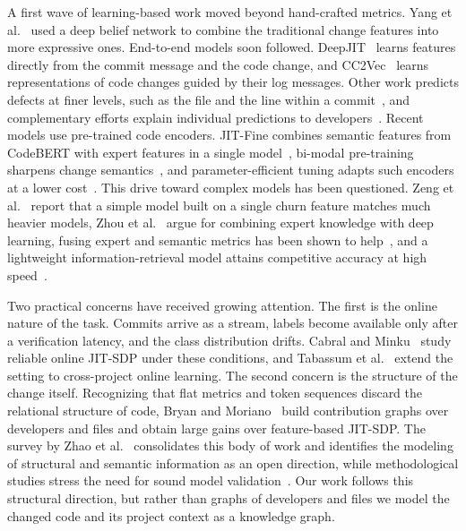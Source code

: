 \documentclass[final,5p,times,twocolumn]{elsarticle}
\theoremstyle{plain}
\begin{document}
A first wave of learning-based work moved beyond hand-crafted metrics. Yang et al.~\cite{yang2015deep} used a deep belief network to combine the traditional change features into more expressive ones. End-to-end models soon followed. DeepJIT~\cite{hoang2019deepjit} learns features directly from the commit message and the code change, and CC2Vec~\cite{hoang2020cc2vec} learns representations of code changes guided by their log messages. Other work predicts defects at finer levels, such as the file and the line within a commit~\cite{pascarella2019fine,pornprasit2021jitline}, and complementary efforts explain individual predictions to developers~\cite{pornprasit2021pyexplainer}. Recent models use pre-trained code encoders. JIT-Fine combines semantic features from CodeBERT with expert features in a single model~\cite{ni2022best}, bi-modal pre-training sharpens change semantics~\cite{jiang2025bicc}, and parameter-efficient tuning adapts such encoders at a lower cost~\cite{abutalib2024parameter}. This drive toward complex models has been questioned. Zeng et al.~\cite{zeng2021deep} report that a simple model built on a single churn feature matches much heavier models, Zhou et al.~\cite{zhou2025bridging} argue for combining expert knowledge with deep learning, fusing expert and semantic metrics has been shown to help~\cite{chen2023boosting}, and a lightweight information-retrieval model attains competitive accuracy at high speed~\cite{sahar2024irjit}.

Two practical concerns have received growing attention. The first is the online nature of the task. Commits arrive as a stream, labels become available only after a verification latency, and the class distribution drifts. Cabral and Minku~\cite{cabral2023towards} study reliable online JIT-SDP under these conditions, and Tabassum et al.~\cite{tabassum2023cross} extend the setting to cross-project online learning. The second concern is the structure of the change itself. Recognizing that flat metrics and token sequences discard the relational structure of code, Bryan and Moriano~\cite{bryan2023graph} build contribution graphs over developers and files and obtain large gains over feature-based JIT-SDP. The survey by Zhao et al.~\cite{zhao2023systematic} consolidates this body of work and identifies the modeling of structural and semantic information as an open direction, while methodological studies stress the need for sound model validation~\cite{tantithamthavorn2017empirical}. Our work follows this structural direction, but rather than graphs of developers and files we model the changed code and its project context as a knowledge graph.
\end{document}
